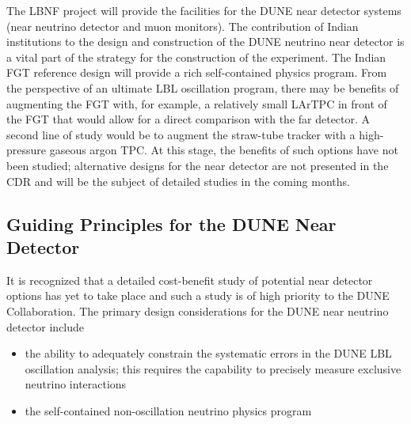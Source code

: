 
The LBNF project will provide the facilities for the DUNE near detector systems 
(near neutrino detector and muon monitors). 
The contribution of Indian institutions to the design and construction of the DUNE 
neutrino near detector is a vital part of the strategy for the construction 
of the experiment. The Indian FGT reference design will provide a rich self-contained physics 
program. From the perspective of an ultimate LBL oscillation program, there may 
be benefits of augmenting the FGT with, for example, a relatively small LArTPC 
in front of the FGT that would allow for a direct comparison with the far detector. 
A second line of study would be to augment the straw-tube tracker  with 
a high-pressure gaseous argon TPC. At this stage, the benefits of such options 
have not been studied; alternative designs for the near detector are not presented in 
the CDR and will be the subject of detailed studies in the coming months. 

\subsection{Guiding Principles for the DUNE Near Detector}

It is recognized that a detailed cost-benefit study of potential near detector options 
has yet to take place and such a study is of high priority to the DUNE Collaboration. The
primary design considerations for the DUNE near neutrino detector include
\begin{itemize}
\item  %
the 
ability to adequately constrain the systematic errors in the DUNE LBL oscillation 
analysis; this requires the capability to precisely measure exclusive neutrino
interactions

\item %
the self-contained non-oscillation 
neutrino physics program

\end{itemize}

